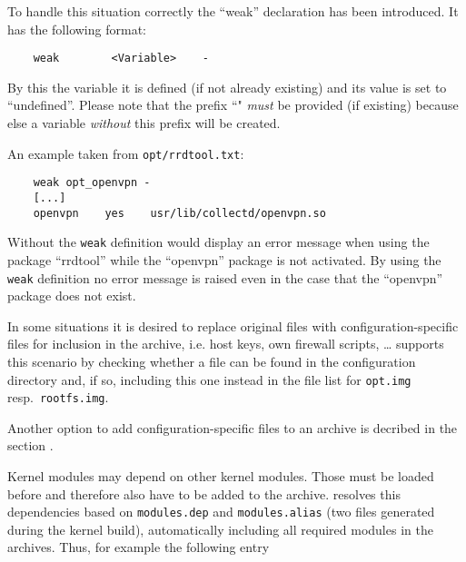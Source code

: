     To handle this situation correctly the ``weak'' declaration has been introduced.
    It has the following format:

\begin{example}
\begin{verbatim}
    weak        <Variable>    -
\end{verbatim}
\end{example}

    By this the variable it is defined (if not already existing) and its value is
    set to ``undefined''. Please note that the prefix ``" \emph{must} be
    provided (if existing) because else a variable \emph{without} this prefix will
    be created.

    An example taken from \texttt{opt/rrdtool.txt}:
\begin{example}
\begin{verbatim}
    weak opt_openvpn -
    [...]
    openvpn    yes    usr/lib/collectd/openvpn.so
\end{verbatim}
\end{example}

Without the \texttt{weak} definition  would display an error message
when using the package ``rrdtool'' while the ``openvpn'' package is not activated.
By using the \texttt{weak} definition no error message is raised even in the case that
the ``openvpn'' package does not exist.


In some situations it is desired to replace original files with configuration-specific
files for inclusion in the archive, i.e. host keys, own firewall scripts, \ldots{}
 supports this scenario by checking whether a file can be found in the
configuration directory and, if so, including this one instead in the file list for
\texttt{opt.img} resp.\ \texttt{rootfs.img}.

Another option to add configuration-specific files to an archive is decribed
in the section .


Kernel modules may depend on other kernel modules. Those must be loaded before
and therefore also have to be added to the archive.  resolves this
dependencies based on \texttt{modules.dep} and \texttt{modules.alias}
(two files generated during the kernel build), automatically including
all required modules in the archives. Thus, for example the following
entry

